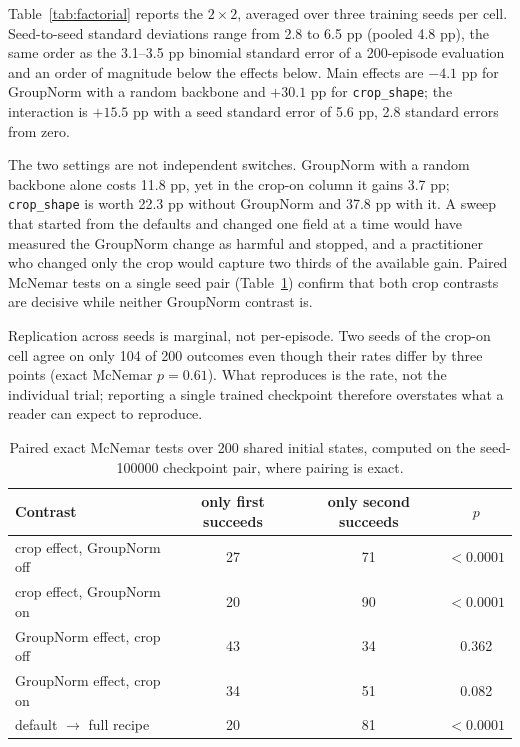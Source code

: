\documentclass[11pt]{article}
\begin{document}
Table~\ref{tab:factorial} reports the $2\times2$, averaged over three training
seeds per cell. Seed-to-seed standard deviations range from 2.8 to 6.5 pp (pooled
4.8 pp), the same order as the 3.1--3.5 pp binomial standard error of a 200-episode
evaluation and an order of magnitude below the effects below. Main effects are
$-4.1$ pp for GroupNorm with a random backbone and $+30.1$ pp for
\texttt{crop\_shape}; the interaction is $+15.5$ pp with a seed standard error of
5.6 pp, 2.8 standard errors from zero.

The two settings are not independent switches. GroupNorm with a random backbone
alone costs 11.8 pp, yet in the crop-on column it gains 3.7 pp;
\texttt{crop\_shape} is worth 22.3 pp without GroupNorm and 37.8 pp with it. A
sweep that started from the defaults and changed one field at a time would have
measured the GroupNorm change as harmful and stopped, and a practitioner who changed
only the crop would capture two thirds of the available gain. Paired McNemar tests
on a single seed pair (Table~\ref{tab:paired}) confirm that both crop contrasts are
decisive while neither GroupNorm contrast is.

Replication across seeds is marginal, not per-episode. Two seeds of the crop-on
cell agree on only 104 of 200 outcomes even though their rates differ by three
points (exact McNemar $p=0.61$). What reproduces is the rate, not the individual
trial; reporting a single trained checkpoint therefore overstates what a reader can
expect to reproduce.

\begin{table}[t]
\centering
\caption{Paired exact McNemar tests over 200 shared initial states, computed on
the seed-100000 checkpoint pair, where pairing is exact.}
\label{tab:paired}
\begin{tabular}{lccc}
\toprule
Contrast & only first succeeds & only second succeeds & $p$ \\
\midrule
crop effect, GroupNorm off & 27 & 71 & $<0.0001$ \\
crop effect, GroupNorm on  & 20 & 90 & $<0.0001$ \\
GroupNorm effect, crop off & 43 & 34 & 0.362 \\
GroupNorm effect, crop on  & 34 & 51 & 0.082 \\
default $\rightarrow$ full recipe & 20 & 81 & $<0.0001$ \\
\bottomrule
\end{tabular}
\end{table}
\end{document}
